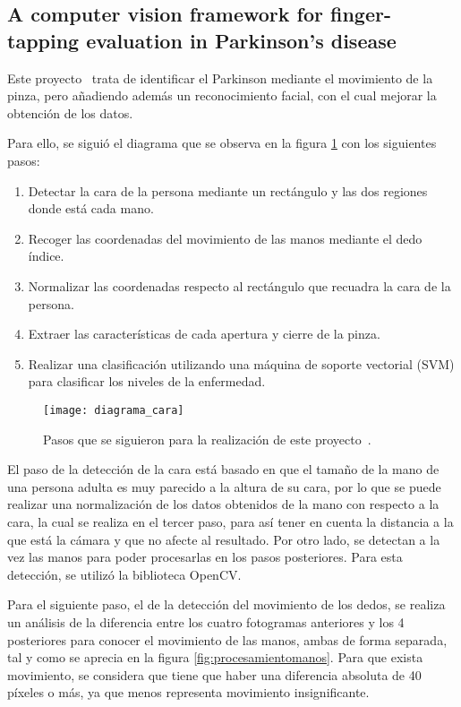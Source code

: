 \subsection{A computer vision framework for finger-tapping evaluation in Parkinson's disease}
Este proyecto~\cite{khan2014computer} trata de identificar el Parkinson mediante el movimiento de la pinza, pero añadiendo además un reconocimiento facial, con el cual mejorar la obtención de los datos.

Para ello, se siguió el diagrama que se observa en la figura \ref{fig:diagramacara} con los siguientes pasos:
 
\begin{enumerate}
	\item Detectar la cara de la persona mediante un rectángulo y las dos regiones donde está cada mano. 
	\item Recoger las coordenadas del movimiento de las manos mediante el dedo índice. 
	\item Normalizar las coordenadas respecto al rectángulo que recuadra la cara de la persona. 
	\item Extraer las características de cada apertura y cierre de la pinza. 
	\item Realizar una clasificación utilizando una máquina de soporte vectorial (SVM) para clasificar los niveles de la enfermedad.
\end{enumerate}

\begin{figure}[h]
	\texttt{[image: diagrama\_cara]}
	\caption{Pasos que se siguieron para la realización de este proyecto~\cite{khan2014computer}.}
	\label{fig:diagramacara}
\end{figure}

El paso de la detección de la cara está basado en que el tamaño de la mano de una persona adulta es muy parecido a la altura de su cara, por lo que se puede realizar una normalización de los datos obtenidos de la mano con respecto a la cara, la cual se realiza en el tercer paso, para así tener en cuenta la distancia a la que está la cámara y que no afecte al resultado. Por otro lado, se detectan a la vez las manos para poder procesarlas en los pasos posteriores. Para esta detección, se utilizó la biblioteca OpenCV.

Para el siguiente paso, el de la detección del movimiento de los dedos, se realiza un análisis de la diferencia entre los cuatro fotogramas anteriores y los 4 posteriores para conocer el movimiento de las manos, ambas de forma separada, tal y como se aprecia en la figura \ref{fig:procesamientomanos}. Para que exista movimiento, se considera que tiene que haber una diferencia absoluta de 40 píxeles o más, ya que menos representa movimiento insignificante.

